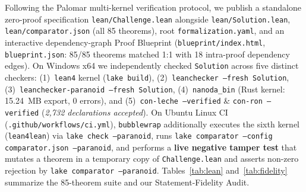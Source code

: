 \documentclass[11pt,letterpaper]{article}
\theoremstyle{remark}
\begin{document}
Following the Palomar multi-kernel verification protocol, we publish a standalone zero-proof specification \texttt{lean/\allowbreak Challenge.lean} alongside \texttt{lean/\allowbreak Solution.lean}, \texttt{lean/\allowbreak comparator.json} (all 85 theorems), root \texttt{formalization.yaml}, and an interactive dependency-graph Proof Blueprint (\texttt{blueprint/\allowbreak index.html}, \texttt{blueprint.json}: 85/85 theorems matched 1:1 with 18 intra-proof dependency edges). On Windows x64 we independently checked \texttt{Solution} across five distinct checkers: (1)~\texttt{lean4} kernel (\texttt{lake build}), (2)~\texttt{leanchecker --fresh Solution}, (3)~\texttt{leanchecker-\allowbreak paranoid --fresh Solution}, (4)~\texttt{nanoda\_\allowbreak bin} (Rust kernel: 15.24~MB export, 0 errors), and (5)~\texttt{con-leche --verified} \& \texttt{con-ron --verified} (\emph{2,732 declarations accepted}). On Ubuntu Linux CI (\texttt{.github/\allowbreak workflows/\allowbreak ci.yml}), \texttt{bubblewrap} additionally executes the sixth kernel (\texttt{lean4lean}) via \texttt{lake check --paranoid}, runs \texttt{lake comparator --config comparator.json --paranoid}, and performs a \textbf{live negative tamper test} that mutates a theorem in a temporary copy of \texttt{Challenge.lean} and asserts non-zero rejection by \texttt{lake comparator --paranoid}. Tables~\ref{tab:lean} and~\ref{tab:fidelity} summarize the 85-theorem suite and our Statement-Fidelity Audit.
\end{document}
